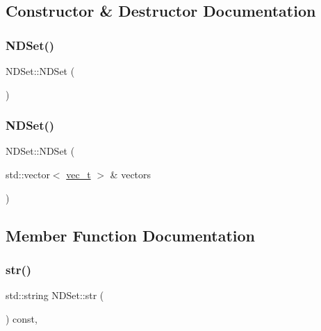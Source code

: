 \subsection{Constructor \& Destructor Documentation}
\mbox{\label{class_n_d_set_a906983146babefe3d4824d282887c083}} 
\subsubsection{\texorpdfstring{NDSet()}{NDSet()}\hspace{0.1cm}{\footnotesize\ttfamily [1/2]}}
{\footnotesize\ttfamily N\+D\+Set\+::\+N\+D\+Set (\begin{DoxyParamCaption}{ }\end{DoxyParamCaption})}

\mbox{\label{class_n_d_set_a2f01f90688a50dffc1b1b19ab3e34a7f}} 
\subsubsection{\texorpdfstring{NDSet()}{NDSet()}\hspace{0.1cm}{\footnotesize\ttfamily [2/2]}}
{\footnotesize\ttfamily N\+D\+Set\+::\+N\+D\+Set (\begin{DoxyParamCaption}\item[{std\+::vector$<$ \mbox{\hyperlink{group___n_algebra_ga0a2cfc67e738a3d73e4f12098c4c07f6}{vec\+\_\+t}} $>$ \&}]{vectors }\end{DoxyParamCaption})\hspace{0.3cm}{\ttfamily [explicit]}}



\subsection{Member Function Documentation}
\mbox{\label{class_n_d_set_ada343b5d74ced1894dfe098c6324d61e}} 
\subsubsection{\texorpdfstring{str()}{str()}}
{\footnotesize\ttfamily std\+::string N\+D\+Set\+::str (\begin{DoxyParamCaption}{ }\end{DoxyParamCaption}) const\hspace{0.3cm}{\ttfamily [override]}, {\ttfamily [virtual]}}



